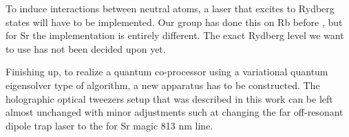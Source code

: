 To induce interactions between neutral atoms, a laser that excites to Rydberg states will have to be implemented. 
Our group has done this on Rb before \cite{Bijnen2013}, but for Sr the implementation is entirely different. 
The exact Rydberg level we want to use has not been decided upon yet. 

Finishing up, to realize a quantum co-processor using a variational quantum eigensolver type of algorithm, a new apparatus has to be constructed. 
The holographic optical tweezers setup that was described in this work can be left almost unchanged with minor adjustments such at changing the far off-resonant dipole trap laser to the for Sr magic 813 nm line. 


